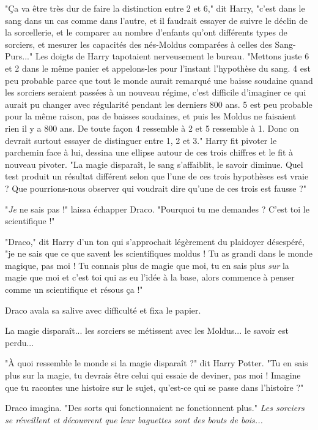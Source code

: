 "Ça va être très dur de faire la distinction entre 2 et 6," dit Harry, "c'est dans le sang dans un cas comme dans l'autre, et il faudrait essayer de suivre le déclin de la sorcellerie, et le comparer au nombre d'enfants qu'ont différents types de sorciers, et mesurer les capacités des nés-Moldus comparées à celles des Sang-Purs..." Les doigts de Harry tapotaient nerveusement le bureau. "Mettons juste 6 et 2 dans le même panier et appelons-les pour l'instant l'hypothèse du sang. 4 est peu probable parce que tout le monde aurait remarqué une baisse soudaine quand les sorciers seraient passées à un nouveau régime, c'est difficile d'imaginer ce qui aurait pu changer avec régularité pendant les derniers 800 ans. 5 est peu probable pour la même raison, pas de baisses soudaines, et puis les Moldus ne faisaient rien il y a 800 ans. De toute façon 4 ressemble à 2 et 5 ressemble à 1. Donc on devrait surtout essayer de distinguer entre 1, 2 et 3." Harry fit pivoter le parchemin face à lui, dessina une ellipse autour de ces trois chiffres et le fit à nouveau pivoter. "La magie disparaît, le sang s'affaiblit, le savoir diminue. Quel test produit un résultat différent selon que l'une de ces trois hypothèses est vraie ? Que pourrions-nous observer qui voudrait dire qu'une de ces trois est fausse ?"

"\emph{Je}  ne sais pas !" laissa échapper Draco. "Pourquoi tu me demandes ? C'est toi le scientifique !"

"Draco," dit Harry d'un ton qui s'approchait légèrement du plaidoyer désespéré, "je ne sais que ce que savent les scientifiques moldus ! Tu as grandi dans le monde magique, pas moi ! Tu connais plus de magie que moi, tu en sais plus \emph{sur}  la magie que moi et c'est toi qui as eu l'idée à la base, alors commence à penser comme un scientifique et résous ça !"

Draco avala sa salive avec difficulté et fixa le papier.

La magie disparaît... les sorciers se métissent avec les Moldus... le savoir est perdu...

"À quoi ressemble le monde si la magie disparaît ?" dit Harry Potter. "Tu en sais plus sur la magie, tu devrais être celui qui essaie de deviner, pas moi ! Imagine que tu racontes une histoire sur le sujet, qu'est-ce qui se passe dans l'histoire ?"

Draco imagina. "Des sorts qui fonctionnaient ne fonctionnent plus." \emph{Les sorciers se réveillent et découvrent que leur baguettes sont des bouts de bois...} 

